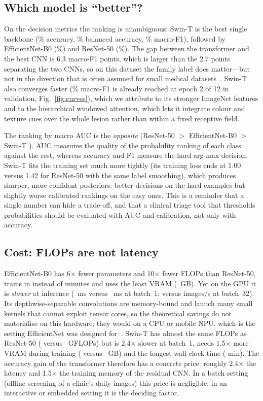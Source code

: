 \subsection{Which model is ``better''?}
On the decision metrics the ranking is unambiguous: Swin-T is the best single backbone
(\SwinAcc\% accuracy, \SwinBalAcc\% balanced accuracy, \SwinFone\% macro-F1), followed by
EfficientNet-B0 (\EffnetFone\%) and ResNet-50 (\ResnetFone\%). The gap between the transformer and
the best CNN is 6.3 macro-F1 points, which is larger than the 2.7 points separating the two CNNs,
so on this dataset the family label does matter---but not in the direction that is often assumed
for small medical datasets~\cite{matsoukas2021transformers}. Swin-T also converges faster
(\SwinFone\% macro-F1 is already reached at epoch 2 of 12 in validation, Fig.~\ref{fig:curves}),
which we attribute to its stronger ImageNet features and to the hierarchical windowed attention,
which lets it integrate colour and texture cues over the whole lesion rather than within a fixed
receptive field.

The ranking by macro AUC is the \emph{opposite} (ResNet-50 \ResnetAuc{} $>$ EfficientNet-B0
\EffnetAuc{} $>$ Swin-T \SwinAuc{}). AUC measures the quality of the probability ranking of each
class against the rest, whereas accuracy and F1 measure the hard arg-max decision. Swin-T fits the
training set much more tightly (its training loss ends at 1.00 versus 1.42 for ResNet-50 with the
same label smoothing), which produces sharper, more confident posteriors: better decisions on the
hard examples but slightly worse calibrated rankings on the easy ones. This is a reminder that a
single number can hide a trade-off, and that a clinical triage tool that thresholds probabilities
should be evaluated with AUC and calibration, not only with accuracy.

\subsection{Cost: FLOPs are not latency}
EfficientNet-B0 has 6$\times$ fewer parameters and 10$\times$ fewer FLOPs than ResNet-50, trains
in \EffnetTrain{} instead of \ResnetTrain{} minutes and uses the least VRAM
(\EffnetVram{}~GB). Yet on the GPU it is \emph{slower} at inference (\EffnetLat{}~ms versus
\ResnetLat{}~ms at batch~1; \EffnetThr{} versus \ResnetThr{} images/s at batch~32). Its
depthwise-separable convolutions are memory-bound and launch many small kernels that cannot
exploit tensor cores, so the theoretical savings do not materialise on this hardware; they would on
a CPU or mobile NPU, which is the setting EfficientNet was designed for~\cite{tan2019efficientnet}.
Swin-T has almost the same FLOPs as ResNet-50 (\SwinGflops{} versus \ResnetGflops{}~GFLOPs) but is
2.4$\times$ slower at batch~1, needs 1.5$\times$ more VRAM during training
(\SwinVram{} versus \ResnetVram{}~GB) and the longest wall-clock time (\SwinTrain{} min). The
accuracy gain of the transformer therefore has a concrete price: roughly 2.4$\times$ the latency and
1.5$\times$ the training memory of the residual CNN. In a batch setting (offline screening of a
clinic's daily images) this price is negligible; in an interactive or embedded setting it is the
deciding factor.

